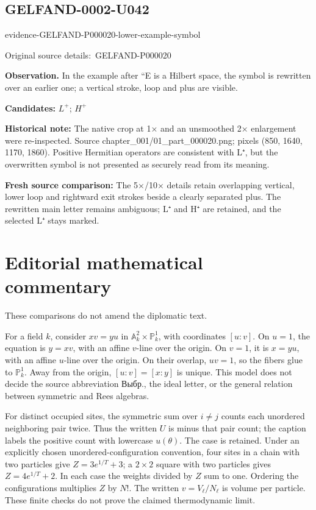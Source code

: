 \documentclass[11pt]{article}
\newcommand{\EvidenceBlock}[4]{%
 \par\smallskip\noindent\begin{minipage}{\linewidth}
 \begin{minipage}[t]{.47\linewidth}\vspace{0pt}\centering
 \csname evidence-#1-#2\endcsname\par
 {\scriptsize\SourceCropCaption\ #1}\par
 \end{minipage}\hfill
 \begin{minipage}[t]{.49\linewidth}\vspace{0pt}\raggedright
 {\small\color{orange!65!black}\textbf{#4} #3}\par
 \end{minipage}
 \end{minipage}\par\smallskip}
\newcommand{\SourceCropCaption}{Original source details:}\newcommand{\ReadingCaption}{Uncertain reading.}\newcommand{\IncompleteCaption}{Undeciphered passage.}\newcommand{\DiagramCaption}{Diagram and typed description.}
\begin{document}
\subsection*{GELFAND-0002-U042}
\EvidenceBlock{GELFAND-P000020}{lower-example-symbol}{In the example after ``E is a Hilbert space, the symbol is rewritten over an earlier one; a vertical stroke, loop and plus are visible.}{Observation.}
\par\smallskip\noindent\textbf{Candidates: } \(L^+\); \(H^+\)\par
\par\smallskip\noindent\textbf{Historical note: } The native crop at 1× and an unsmoothed 2× enlargement were re-inspected. Source chapter\_001/01\_part\_000020.png; pixels (850, 1640, 1170, 1860). Positive Hermitian operators are consistent with L⁺, but the overwritten symbol is not presented as securely read from its meaning.\par
\par\smallskip\noindent\textbf{Fresh source comparison: } The 5×/10× details retain overlapping vertical, lower loop and rightward exit strokes beside a clearly separated plus. The rewritten main letter remains ambiguous; L⁺ and H⁺ are retained, and the selected L⁺ stays marked.\par
\clearpage\section*{Editorial mathematical commentary}
These comparisons do not amend the diplomatic text.

For a field \(k\), consider \(xv=yu\) in \(\mathbb A^2_k\times\mathbb P^1_k\), with coordinates \([u:v]\). On \(u=1\), the equation is \(y=xv\), with an affine \(v\)-line over the origin. On \(v=1\), it is \(x=yu\), with an affine \(u\)-line over the origin. On their overlap, \(uv=1\), so the fibers glue to \(\mathbb P^1_k\). Away from the origin, \([u:v]=[x:y]\) is unique. This model does not decide the source abbreviation Выбр., the ideal letter, or the general relation between symmetric and Rees algebras.

For distinct occupied sites, the symmetric sum over \(i\ne j\) counts each unordered neighboring pair twice. Thus the written \(U\) is minus that pair count; the caption labels the positive count with lowercase \(u(\theta)\). The case is retained. Under an explicitly chosen unordered-configuration convention, four sites in a chain with two particles give \(Z=3e^{1/T}+3\); a \(2\times2\) square with two particles gives \(Z=4e^{1/T}+2\). In each case the weights divided by \(Z\) sum to one. Ordering the configurations multiplies \(Z\) by \(N!\). The written \(v=V_\ell/N_\ell\) is volume per particle. These finite checks do not prove the claimed thermodynamic limit.
\end{document}
